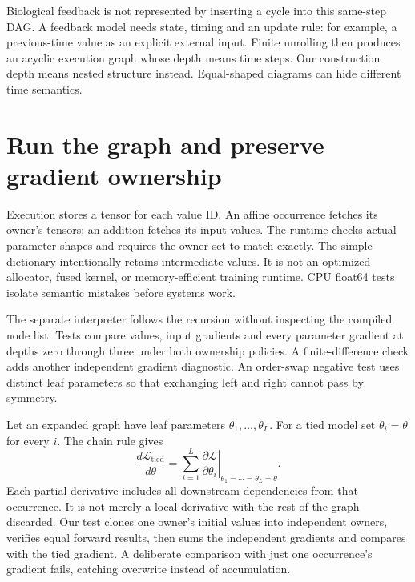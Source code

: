 Biological feedback is not represented by inserting a cycle into this
same-step DAG. A feedback model needs state, timing and an update rule:
for example, a previous-time value as an explicit external input.
Finite unrolling then produces an acyclic execution graph whose depth
means time steps. Our construction depth means nested structure instead.
Equal-shaped diagrams can hide different time semantics.

\section{Run the graph and preserve gradient ownership}
Execution stores a tensor for each value ID. An affine occurrence fetches
its owner's tensors; an addition fetches its input values. The runtime
checks actual parameter shapes and requires the owner set to match exactly.
The simple dictionary intentionally retains intermediate values. It is
not an optimized allocator, fused kernel, or memory-efficient training
runtime. CPU float64 tests isolate semantic mistakes before systems work.

The separate interpreter follows the recursion without inspecting the
compiled node list:
Tests compare values, input gradients and every parameter gradient at
depths zero through three under both ownership policies. A finite-difference
check adds another independent gradient diagnostic. An order-swap negative
test uses distinct leaf parameters so that exchanging left and right
cannot pass by symmetry.


Let an expanded graph have leaf parameters $\theta_1,\ldots,\theta_L$.
For a tied model set $\theta_i=\theta$ for every $i$.
The chain rule gives
\begin{equation}
 \frac{d\mathcal L_{\mathrm{tied}}}{d\theta}
 =\sum_{i=1}^{L}
   \left.\frac{\partial\mathcal L}{\partial\theta_i}
   \right|_{\theta_1=\cdots=\theta_L=\theta}.
\end{equation}
Each partial derivative includes all downstream dependencies from that
occurrence. It is not merely a local derivative with the rest of the graph
discarded. Our test clones one owner's initial values into independent
owners, verifies equal forward results, then sums the independent gradients
and compares with the tied gradient. A deliberate comparison with just one
occurrence's gradient fails, catching overwrite instead of accumulation.

